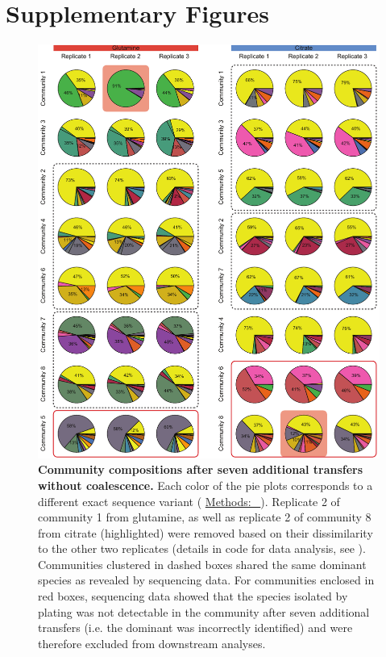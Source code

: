 \documentclass[a4paper,10pt]{article}
\newcommand{\methodsref}[1]{%
  \hyperref[{#1}]{%
   Methods:~\nameref*{#1}%
  }%
}
\begin{document}
\clearpage

\section*{Supplementary Figures}

\renewcommand{\thefigure}{S\arabic{figure}}
\setcounter{figure}{0} 

\begin{figure}[!h]
\centering
\internallinenumbers
\includegraphics[width=15cm,keepaspectratio]{figs/figS1.pdf}
\caption{\textbf{Community compositions after seven additional transfers without coalescence.}
Each color of the pie plots corresponds to a different exact sequence variant
(\methodsref{methods:sequencing}).
Replicate 2 of community 1 from glutamine,
as well as replicate 2 of community 8 from citrate (highlighted) were removed based on their
dissimilarity to the other two replicates (details in code for data analysis, see
).
Communities clustered in dashed boxes shared the same dominant species as revealed by
sequencing data.
For communities enclosed in red boxes, sequencing data showed that the species isolated by plating
was not detectable in the community after seven additional transfers (i.e. the dominant was
incorrectly identified) and were therefore excluded from downstream analyses.}
\label{figS1}
\end{figure}
\end{document}
